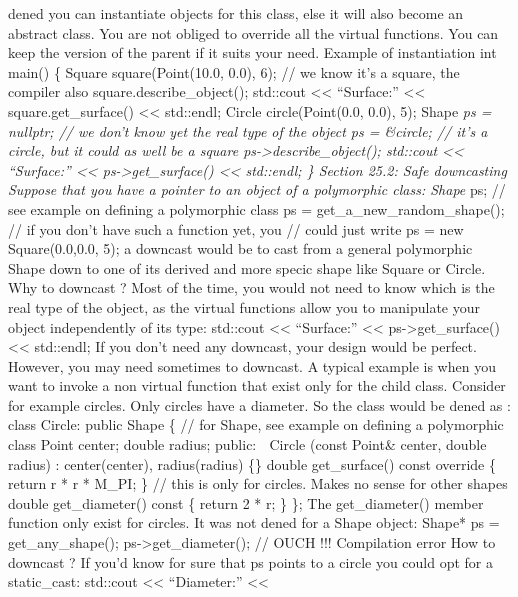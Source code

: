 dened you can instantiate objects for this class, else it will also
become an abstract class. You are not obliged to override all the
virtual functions. You can keep the version of the parent if it suits
your need. Example of instantiation int main() \{ Square
square(Point(10.0, 0.0), 6); // we know it's a square, the compiler also
square.describe\_object(); std::cout \textless\textless{} ``Surface:''
\textless\textless{} square.get\_surface() \textless\textless{}
std::endl; Circle circle(Point(0.0, 0.0), 5); Shape \emph{ps = nullptr;
// we don't know yet the real type of the object ps = \&circle; // it's
a circle, but it could as well be a square
ps-\textgreater describe\_object(); std::cout \textless\textless{}
``Surface:'' \textless\textless{} ps-\textgreater get\_surface()
\textless\textless{} std::endl; \} Section 25.2: Safe downcasting
Suppose that you have a pointer to an object of a polymorphic class:
Shape }ps; // see example on defining a polymorphic class ps =
get\_a\_new\_random\_shape(); // if you don't have such a function yet,
you // could just write ps = new Square(0.0,0.0, 5); a downcast would be
to cast from a general polymorphic Shape down to one of its derived and
more specic shape like Square or Circle. Why to downcast ? Most of the
time, you would not need to know which is the real type of the object,
as the virtual functions allow you to manipulate your object
independently of its type: std::cout \textless\textless{} ``Surface:''
\textless\textless{} ps-\textgreater get\_surface() \textless\textless{}
std::endl; If you don't need any downcast, your design would be perfect.
However, you may need sometimes to downcast. A typical example is when
you want to invoke a non virtual function that exist only for the child
class. Consider for example circles. Only circles have a diameter. So
the class would be dened as : class Circle: public Shape \{ // for
Shape, see example on defining a polymorphic class Point center; double
radius; public:  Circle (const Point\& center, double radius) :
center(center), radius(radius) \{\} double get\_surface() const override
\{ return r * r * M\_PI; \} // this is only for circles. Makes no sense
for other shapes double get\_diameter() const \{ return 2 * r; \} \};
The get\_diameter() member function only exist for circles. It was not
dened for a Shape object: Shape* ps = get\_any\_shape();
ps-\textgreater get\_diameter(); // OUCH !!! Compilation error How to
downcast ? If you'd know for sure that ps points to a circle you could
opt for a static\_cast: std::cout \textless\textless{} ``Diameter:''
\textless\textless{}
